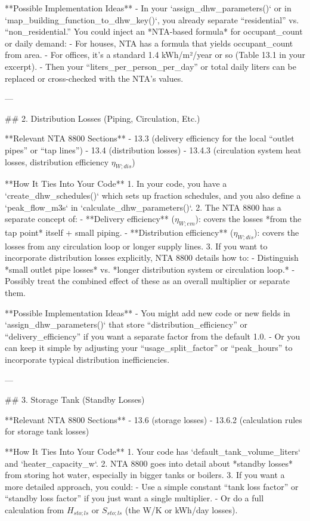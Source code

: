 **Possible Implementation Ideas**  
- In your `assign_dhw_parameters()` or in `map_building_function_to_dhw_key()`, you already separate “residential” vs. “non_residential.” You could inject an *NTA-based formula* for occupant_count or daily demand:
  - For houses, NTA has a formula that yields occupant_count from area.  
  - For offices, it’s a standard 1.4 kWh/m²/year or so (Table 13.1 in your excerpt).  
- Then your “liters_per_person_per_day” or total daily liters can be replaced or cross-checked with the NTA’s values.  

---

## 2. Distribution Losses (Piping, Circulation, Etc.)

**Relevant NTA 8800 Sections**  
- 13.3 (delivery efficiency for the local “outlet pipes” or “tap lines”)  
- 13.4 (distribution losses)  
- 13.4.3 (circulation system heat losses, distribution efficiency \(\eta_{W;dis}\))  

**How It Ties Into Your Code**  
1. In your code, you have a `create_dhw_schedules()` which sets up fraction schedules, and you also define a `peak_flow_m3s` in `calculate_dhw_parameters()`.  
2. The NTA 8800 has a separate concept of:
   - **Delivery efficiency** (\(\eta_{W;em}\)): covers the losses *from the tap point* itself + small piping.  
   - **Distribution efficiency** (\(\eta_{W;dis}\)): covers the losses from any circulation loop or longer supply lines.  
3. If you want to incorporate distribution losses explicitly, NTA 8800 details how to:
   - Distinguish *small outlet pipe losses* vs. *longer distribution system or circulation loop.*  
   - Possibly treat the combined effect of these as an overall multiplier or separate them.  

**Possible Implementation Ideas**  
- You might add new code or new fields in `assign_dhw_parameters()` that store “distribution_efficiency” or “delivery_efficiency” if you want a separate factor from the default 1.0.  
- Or you can keep it simple by adjusting your “usage_split_factor” or “peak_hours” to incorporate typical distribution inefficiencies.  

---

## 3. Storage Tank (Standby Losses)

**Relevant NTA 8800 Sections**  
- 13.6 (storage losses)  
- 13.6.2 (calculation rules for storage tank losses)  

**How It Ties Into Your Code**  
1. Your code has `default_tank_volume_liters` and `heater_capacity_w`.  
2. NTA 8800 goes into detail about *standby losses* from storing hot water, especially in bigger tanks or boilers.  
3. If you want a more detailed approach, you could:
   - Use a simple constant “tank loss factor” or “standby loss factor” if you just want a single multiplier.  
   - Or do a full calculation from \(H_{sto;ls}\) or \(S_{sto;ls}\) (the W/K or kWh/day losses).  

